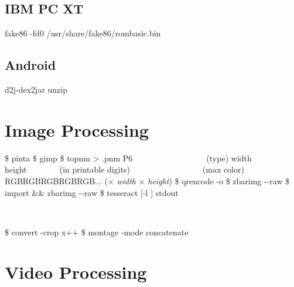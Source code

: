 \documentclass{refcard}
\begin{document}
\subsection{IBM PC XT}

\begin{ldesc}
	 fake86 -fd0 /usr/share/fake86/rombasic.bin
	\\ %
\end{ldesc}

\subsection{Android}

\begin{ldesc}
	   d2j-dex2jar 
	 unzip 
\end{ldesc}

\section{Image Processing}

\begin{ldesc}
	   \$ pinta 
	 \$ gimp 
	    \$ topnm  > .pnm
	 P6~~~~~~~~~~~~~~~~~~\textnormal{(type)}\li
	                      width height~~~~~~~~\textnormal{(in printable digits)} ~~~~~~~~~~~~~~~~~\textnormal{(max color)} \li
					      RGBRGBRGBRGBRGB...  \textnormal{($\times$ \textit{width} $\times$ \textit{height})}
	 \$ qrencode  -o 
	      \$ zbarimg -{-}raw 
	  \$ import  \&\& zbarimg -{-}raw 
	 \$ tesseract [-l ]  stdout
\end{ldesc}\\[0pt]
\begin{ldesc}
	\li[Crop]                 \$ convert -crop x++  
	       \$ montage -mode concatenate  
\end{ldesc}


\section{Video Processing}
\end{document}
